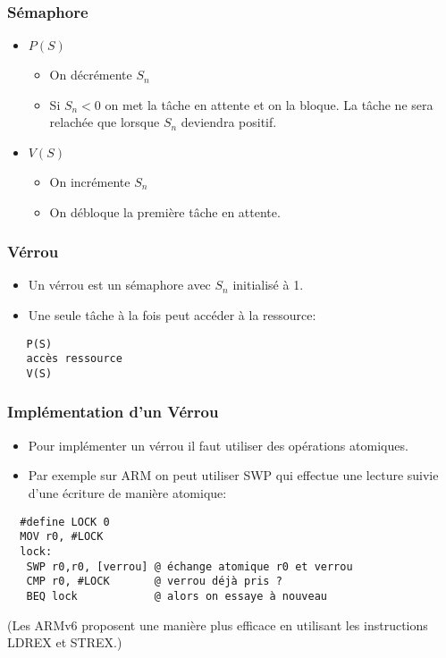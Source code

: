 \documentclass[ignorenonframetext,]{beamer}
\begin{document}
\begin{frame}\frametitle{Sémaphore}

\begin{itemize}
\item
  $P(S)$

  \begin{itemize}
  \item
    On décrémente $S_n$
  \item
    Si $S_n < 0$ on met la tâche en attente et on la bloque. La tâche ne
    sera relachée que lorsque $S_n$ deviendra positif.
  \end{itemize}
\item
  $V(S)$

  \begin{itemize}
  \item
    On incrémente $S_n$
  \item
    On débloque la première tâche en attente.
  \end{itemize}
\end{itemize}

\end{frame}

\begin{frame}[fragile]\frametitle{Vérrou}

\begin{itemize}
\item
  Un vérrou est un sémaphore avec $S_n$ initialisé à 1.
\item
  Une seule tâche à la fois peut accéder à la ressource:
\end{itemize}

\begin{verbatim}
   P(S)
   accès ressource
   V(S)
\end{verbatim}

\end{frame}

\begin{frame}[fragile]\frametitle{Implémentation d'un Vérrou}

\begin{itemize}
\item
  Pour implémenter un vérrou il faut utiliser des opérations atomiques.
\item
  Par exemple sur ARM on peut utiliser SWP qui effectue une lecture
  suivie d'une écriture de manière atomique:
\end{itemize}

\begin{verbatim}
  #define LOCK 0
  MOV r0, #LOCK
  lock:
   SWP r0,r0, [verrou] @ échange atomique r0 et verrou
   CMP r0, #LOCK       @ verrou déjà pris ?
   BEQ lock            @ alors on essaye à nouveau
\end{verbatim}

(Les ARMv6 proposent une manière plus efficace en utilisant les
instructions LDREX et STREX.)

\end{frame}
\end{document}
